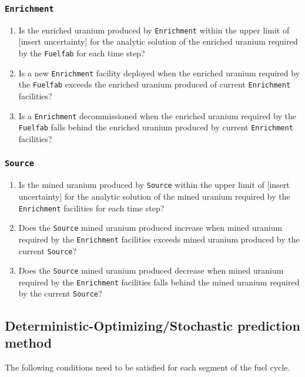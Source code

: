 \documentclass[12pt,letterpaper]{article}
\begin{document}
\subsubsection{\texttt{Enrichment}}
\begin{enumerate}
\item  Is the enriched uranium produced by \texttt{Enrichment} within the upper limit of [insert uncertainty] for the analytic solution of the enriched uranium required by the \texttt{Fuelfab} for each time step? 

\item Is a new \texttt{Enrichment} facility deployed when the enriched uranium required by the \texttt{Fuelfab} exceeds the enriched uranium produced of current \texttt{Enrichment} facilities?

\item Is a \texttt{Enrichment} decommissioned when the enriched uranium required by the \texttt{Fuelfab} falls behind the enriched uranium produced by current \texttt{Enrichment} facilities?
\end{enumerate}

\subsubsection{\texttt{Source}}
\begin{enumerate}
\item Is the mined uranium produced by \texttt{Source} within the upper limit of [insert uncertainty] for the analytic solution of the mined uranium required by the \texttt{Enrichment} facilities for each time step? 

\item Does the \texttt{Source} mined uranium produced increase when mined uranium required by the \texttt{Enrichment} facilities exceeds mined uranium produced by the current \texttt{Source}?

\item Does the \texttt{Source} mined uranium produced decrease when mined uranium required by the \texttt{Enrichment} facilities falls behind the mined uranium required by the current \texttt{Source}?
\end{enumerate}

\subsection{Deterministic-Optimizing/Stochastic prediction method}
The following conditions need to be satisfied for each segment of the fuel cycle. 
\end{document}
